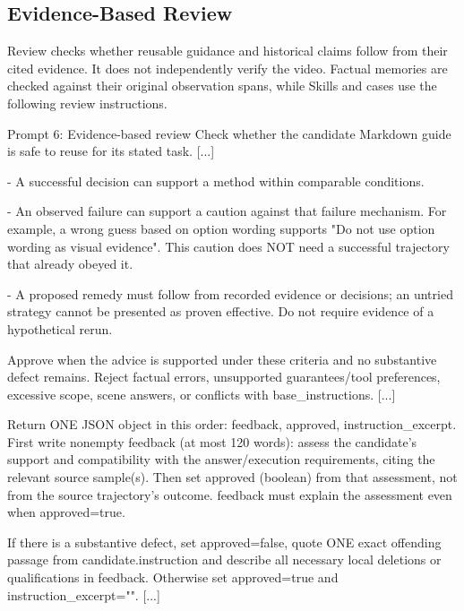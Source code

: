 \subsection{Evidence-Based Review}

Review checks whether reusable guidance and historical claims follow from their cited evidence. It does not independently verify the video. Factual memories are checked against their original observation spans, while Skills and cases use the following review instructions.

\begin{AppendixPrompt}{Prompt 6: Evidence-based review}
Check whether the candidate Markdown guide is safe to reuse for its stated task. [...]

- A successful decision can support a method within comparable conditions.

- An observed failure can support a caution against that failure mechanism. For example, a wrong guess based on option wording supports "Do not use option wording as visual evidence". This caution does NOT need a successful trajectory that already obeyed it.

- A proposed remedy must follow from recorded evidence or decisions; an untried strategy cannot be presented as proven effective. Do not require evidence of a hypothetical rerun.

Approve when the advice is supported under these criteria and no substantive defect remains. Reject factual errors, unsupported guarantees/tool preferences, excessive scope, scene answers, or conflicts with base\_instructions. [...]

Return ONE JSON object in this order: feedback, approved, instruction\_excerpt. First write nonempty feedback (at most 120 words): assess the candidate's support and compatibility with the answer/execution requirements, citing the relevant source sample(s). Then set approved (boolean) from that assessment, not from the source trajectory's outcome. feedback must explain the assessment even when approved=true.

If there is a substantive defect, set approved=false, quote ONE exact offending passage from candidate.instruction and describe all necessary local deletions or qualifications in feedback. Otherwise set approved=true and instruction\_excerpt="". [...]
\end{AppendixPrompt}

